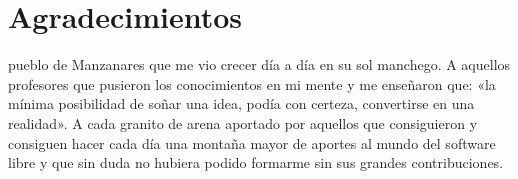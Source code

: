 
\chapter*{Agradecimientos}

  pueblo de Manzanares que me vio crecer día a día en su sol
manchego.
A aquellos profesores que pusieron los conocimientos en mi mente y me 
enseñaron que: «la mínima posibilidad de soñar una idea, podía con certeza,
convertirse en una realidad». A cada granito de arena aportado por aquellos
que consiguieron y consiguen hacer cada día una montaña mayor de aportes al
mundo del software libre y que sin duda no hubiera podido formarme sin sus
grandes contribuciones.

\dedication{A mis padres, \\ por recordarme a diario
que \\«no hay nada imposible para los corazones valientes»}


